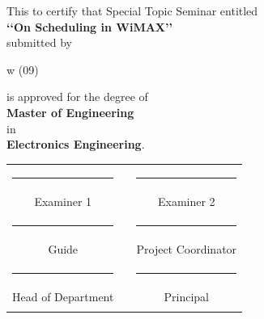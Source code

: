\begin{center}
\large This to certify that Special Topic Seminar entitled\\
\textbf{\lq\lq On Scheduling in WiMAX\rq\rq} \\submitted by
\begin{center}
 w (09)\\
\end{center}
is approved for the degree of \\ \textbf {Master of Engineering}\\ in\\ \textbf {Electronics Engineering}.\\

\vspace{1in}
\begin{tabular}{ccc}
      \rule{5cm}{1sp}                &\rule{10mm}{0pt}& \rule{5cm}{1sp}
      \\\vspace{0.5in}
      Examiner 1                 && Examiner 2 \\
      \rule{5cm}{1sp}                && \rule{5cm}{1sp} \\ \vspace{0.5in}
       Guide             && Project Coordinator \\
      \rule{5cm}{1sp}                && \rule{5cm}{1sp} \\
      Head of Department                && Principal \\\\
    \end{tabular}
\end{center}
\cleardoublepage


